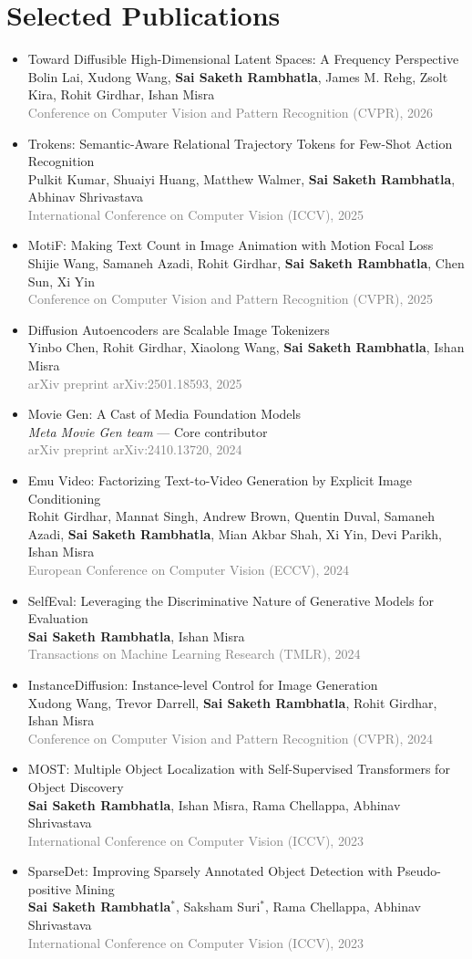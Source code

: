 \documentclass[10pt, letterpaper]{article}
\newcommand{\pub}[3]{\item \begin{minipage}[t]{\linewidth}#1\\#2\\\textcolor{gray}{#3}\end{minipage}} %
\newcommand{\me}{\textbf{Sai Saketh Rambhatla}} %
\begin{document}
    \section{Selected Publications}
\begin{itemize}[itemsep=3pt, parsep=0pt, topsep=2pt]
\pub{Toward Diffusible High-Dimensional Latent Spaces: A Frequency Perspective}
    {Bolin Lai, Xudong Wang, \me, James M. Rehg, Zsolt Kira, Rohit Girdhar, Ishan Misra}
    {Conference on Computer Vision and Pattern Recognition (CVPR), 2026}

\pub{Trokens: Semantic-Aware Relational Trajectory Tokens for Few-Shot Action Recognition}
    {Pulkit Kumar, Shuaiyi Huang, Matthew Walmer, \me, Abhinav Shrivastava}
    {International Conference on Computer Vision (ICCV), 2025}

\pub{MotiF: Making Text Count in Image Animation with Motion Focal Loss}
    {Shijie Wang, Samaneh Azadi, Rohit Girdhar, \me, Chen Sun, Xi Yin}
    {Conference on Computer Vision and Pattern Recognition (CVPR), 2025}

\pub{Diffusion Autoencoders are Scalable Image Tokenizers}
    {Yinbo Chen, Rohit Girdhar, Xiaolong Wang, \me, Ishan Misra}
    {arXiv preprint arXiv:2501.18593, 2025}

\pub{Movie Gen: A Cast of Media Foundation Models}
    {\textit{Meta Movie Gen team} --- Core contributor}
    {arXiv preprint arXiv:2410.13720, 2024}

\pub{Emu Video: Factorizing Text-to-Video Generation by Explicit Image Conditioning}
    {Rohit Girdhar, Mannat Singh, Andrew Brown, Quentin Duval, Samaneh Azadi, \me, Mian Akbar Shah, Xi Yin, Devi Parikh, Ishan Misra}
    {European Conference on Computer Vision (ECCV), 2024}

\pub{SelfEval: Leveraging the Discriminative Nature of Generative Models for Evaluation}
    {\me, Ishan Misra}
    {Transactions on Machine Learning Research (TMLR), 2024}

\pub{InstanceDiffusion: Instance-level Control for Image Generation}
    {Xudong Wang, Trevor Darrell, \me, Rohit Girdhar, Ishan Misra}
    {Conference on Computer Vision and Pattern Recognition (CVPR), 2024}

\pub{MOST: Multiple Object Localization with Self-Supervised Transformers for Object Discovery}
    {\me, Ishan Misra, Rama Chellappa, Abhinav Shrivastava}
    {International Conference on Computer Vision (ICCV), 2023}

\pub{SparseDet: Improving Sparsely Annotated Object Detection with Pseudo-positive Mining}
    {\me$^{*}$, Saksham Suri$^{*}$, Rama Chellappa, Abhinav Shrivastava}
    {International Conference on Computer Vision (ICCV), 2023}


\end{itemize}
\end{document}
